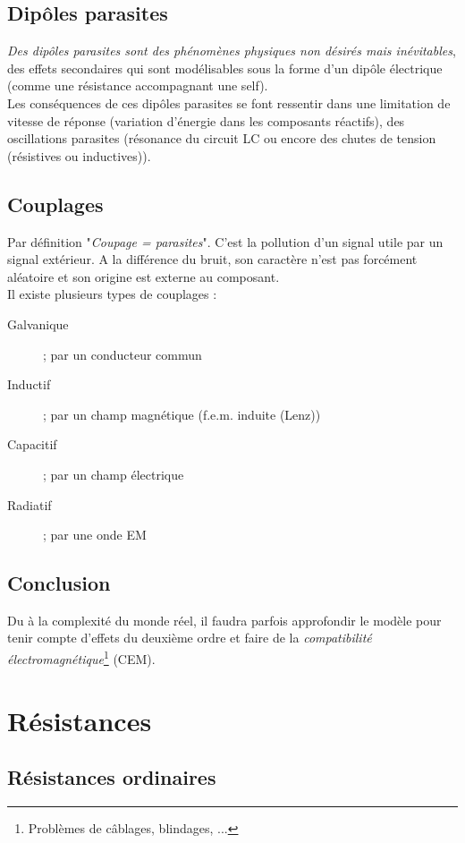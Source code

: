 \subsection{Dipôles parasites}
\textit{Des dipôles parasites sont des phénomènes physiques non désirés mais inévitables}, des effets secondaires qui sont modélisables sous la forme d'un dipôle électrique (comme une résistance accompagnant une self).\\
Les conséquences de ces dipôles parasites se font ressentir dans une limitation de vitesse de réponse (variation d'énergie dans les composants réactifs), des oscillations parasites (résonance du circuit LC ou encore des chutes de tension (résistives ou inductives)).


\subsection{Couplages}
Par définition "\textit{Coupage = parasites}". C'est la pollution d'un signal utile par un signal extérieur. A la différence du bruit, son caractère n'est pas forcément aléatoire et son origine est externe au composant.\\
Il existe plusieurs types de couplages :
\begin{description}
	\item[Galvanique]; par un conducteur commun
	\item[Inductif]; par un champ magnétique (f.e.m. induite (Lenz))
	\item[Capacitif]; par un champ électrique
	\item[Radiatif]; par une onde EM
\end{description}


\subsection{Conclusion}
Du à la complexité du monde réel, il faudra parfois approfondir le modèle pour tenir compte d'effets du deuxième ordre et faire de la \textit{compatibilité électromagnétique}\footnote{Problèmes de câblages, blindages, ...} (CEM).


\section{Résistances}
\subsection{Résistances ordinaires}
